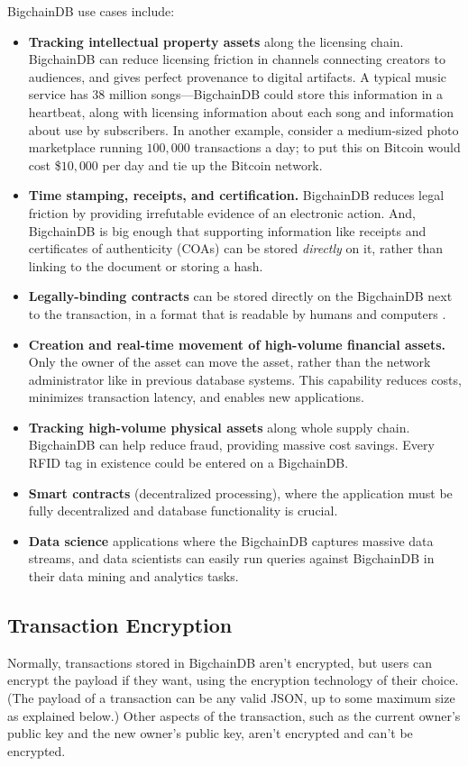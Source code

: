 BigchainDB use cases include:
\begin{itemize}
 \item \textbf{Tracking intellectual property assets} along the licensing chain. BigchainDB can reduce licensing friction in channels connecting creators to audiences, and gives perfect provenance to digital artifacts. A typical music service has $38$ million songs—BigchainDB could store this information in a heartbeat, along with licensing information about each song and information about use by subscribers. In another example, consider a medium-sized photo marketplace running $100,000$ transactions a day; to put this on Bitcoin would cost \$$10,000$ per day and tie up the Bitcoin network.
 \item \textbf{Time stamping, receipts, and certification.} BigchainDB reduces legal friction by providing irrefutable evidence of an electronic action. And, BigchainDB is big enough that supporting information like receipts and certificates of authenticity (COAs) can be stored \textit{directly} on it, rather than linking to the document or storing a hash.
 \item \textbf{Legally-binding contracts} can be stored directly on the BigchainDB next to the transaction, in a format that is readable by humans and computers \cite{grigg2004ricardian}.
 \item \textbf{Creation and real-time movement of high-volume financial assets.} Only the owner of the asset can move the asset, rather than the network administrator like in previous database systems. This capability reduces costs, minimizes transaction latency, and enables new applications.
 \item \textbf{Tracking high-volume physical assets} along whole supply chain. BigchainDB can help reduce fraud, providing massive cost savings. Every RFID tag in existence could be entered on a BigchainDB.
 \item \textbf{Smart contracts} (decentralized processing), where the application must be fully decentralized and database functionality is crucial.
 \item \textbf{Data science} applications where the BigchainDB captures massive data streams, and data scientists can easily run queries against BigchainDB in their data mining and analytics tasks.
\end{itemize}

\subsection{Transaction Encryption}
Normally, transactions stored in BigchainDB aren't encrypted, but users can encrypt the payload if they want, using the encryption technology of their choice. (The payload of a transaction can be any valid JSON, up to some maximum size as explained below.) Other aspects of the transaction, such as the current owner's public key and the new owner's public key, aren't encrypted and can't be encrypted.

